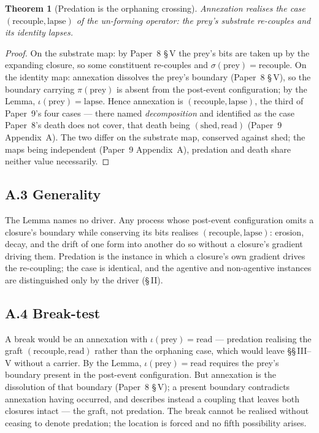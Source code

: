 \documentclass[11pt,oneside]{report}
\newtheorem{theorem}{Theorem}[section]
\theoremstyle{definition}
\theoremstyle{remark}
\begin{document}
\begin{theorem}[Predation is the orphaning crossing]
Annexation realises the case \ensuremath{(\text{recouple}, \text{lapse})} of the un-forming operator: the prey's substrate re-couples and its identity lapses.
\end{theorem}

\begin{proof}
On the substrate map: by Paper~8 \S\,V the prey's bits are taken up by the expanding closure, so some constituent re-couples and \ensuremath{\sigma(\text{prey}) = \text{recouple}}. On the identity map: annexation dissolves the prey's boundary (Paper~8 \S\,V), so the boundary carrying \ensuremath{\pi(\text{prey})} is absent from the post-event configuration; by the Lemma, \ensuremath{\iota(\text{prey}) = \text{lapse}}. Hence annexation is \ensuremath{(\text{recouple}, \text{lapse})}, the third of Paper~9's four cases --- there named \emph{decomposition} and identified as the case Paper~8's death does not cover, that death being \ensuremath{(\text{shed}, \text{read})} (Paper~9 Appendix~A). The two differ on the substrate map, conserved against shed; the maps being independent (Paper~9 Appendix~A), predation and death share neither value necessarily.
\end{proof}

\subsection*{A.3 Generality}

The Lemma names no driver. Any process whose post-event configuration omits a closure's boundary while conserving its bits realises \ensuremath{(\text{recouple}, \text{lapse})}: erosion, decay, and the drift of one form into another do so without a closure's gradient driving them. Predation is the instance in which a closure's own gradient drives the re-coupling; the case is identical, and the agentive and non-agentive instances are distinguished only by the driver (\S\,II).

\subsection*{A.4 Break-test}

A break would be an annexation with \ensuremath{\iota(\text{prey}) = \text{read}} --- predation realising the graft \ensuremath{(\text{recouple}, \text{read})} rather than the orphaning case, which would leave \S\S\,III--V without a carrier. By the Lemma, \ensuremath{\iota(\text{prey}) = \text{read}} requires the prey's boundary present in the post-event configuration. But annexation is the dissolution of that boundary (Paper~8 \S\,V); a present boundary contradicts annexation having occurred, and describes instead a coupling that leaves both closures intact --- the graft, not predation. The break cannot be realised without ceasing to denote predation; the location is forced and no fifth possibility arises.
\end{document}
